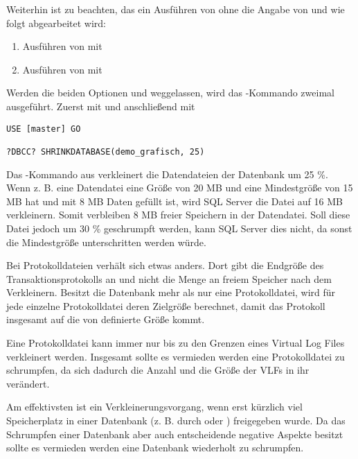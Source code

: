           Weiterhin ist zu beachten, das ein Ausführen von
           ohne die Angabe von
           und  wie folgt
          abgearbeitet wird:
          \begin{enumerate}
            \item Ausführen von  mit
            \item Ausführen von  mit
          \end{enumerate}
          \begin{merke}
            Werden die beiden Optionen  und
             weggelassen, wird das
            -Kommando zweimal ausgeführt. Zuerst mit
             und anschließend mit
          \end{merke}        
          \begin{lstlisting}[language=ms_sql,caption={Verkleinern einer
          Datenbank},label=admin03_35]
USE [master] GO

?DBCC? SHRINKDATABASE(demo_grafisch, 25)
          \end{lstlisting}          
          Das -Kommando aus 
          verkleinert die Datendateien der Datenbank 
          um 25 \%. Wenn z. B. eine Datendatei eine Größe von 20 MB und
          eine Mindestgröße von 15 MB hat und mit 8 MB Daten gefüllt ist, wird SQL
          Server die Datei auf 16 MB verkleinern. Somit verbleiben 8 MB freier
          Speichern in der Datendatei. Soll diese Datei jedoch um 30 \%
          geschrumpft werden, kann SQL Server dies nicht, da sonst die
          Mindestgröße unterschritten werden würde.
        
          Bei Protokolldateien verhält sich  etwas
          anders. Dort gibt  die Endgröße des
          Transaktionsprotokolls an und nicht die Menge an freiem Speicher nach
          dem Verkleinern. Besitzt die Datenbank mehr als nur eine Protokolldatei,
          wird f\"ur jede einzelne Protokolldatei deren Zielgröße berechnet, damit
          das Protokoll insgesamt auf die von 
          definierte Größe kommt.
          \begin{merke}
            Eine Protokolldatei kann immer nur bis zu den Grenzen eines Virtual
            Log Files verkleinert werden. Insgesamt sollte es vermieden werden
            eine Protokolldatei zu schrumpfen, da sich dadurch die Anzahl und die
            Größe der VLFs in ihr verändert.
          \end{merke}
          Am effektivsten ist ein Verkleinerungsvorgang, wenn erst kürzlich viel
          Speicherplatz in einer Datenbank (z. B. durch 
          oder ) freigegeben wurde. Da das Schrumpfen
          einer Datenbank aber auch entscheidende negative Aspekte besitzt sollte
          es vermieden werden eine Datenbank wiederholt zu schrumpfen.
